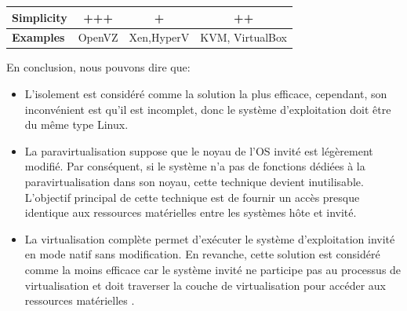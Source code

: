 \begin{table}[H]
\begin{tabular}{|l|c|c|c|}
\textbf{Simplicity}         & +++                                     & +                                                                                                                                                                                                 & ++                                                                                                                                                                                                                    \\ \hline
\textbf{Examples}           & OpenVZ                                  & Xen,HyperV                                                                                                                                                                                        & KVM, VirtualBox                                                                                                                                                                                                       \\ \hline
\end{tabular}
\end{table}

En conclusion, nous pouvons dire que:

\begin{itemize}
    \item 	L'isolement est considéré comme la solution la plus efficace, cependant, son inconvénient est qu'il est incomplet, donc le système d'exploitation doit être du même type Linux.
\item	La paravirtualisation suppose que le noyau de l'OS invité est légèrement modifié. Par conséquent, si le système n'a pas de fonctions dédiées à la paravirtualisation dans son noyau, cette technique devient inutilisable. L'objectif principal de cette technique est de fournir un accès presque identique aux ressources matérielles entre les systèmes hôte et invité.
\item La virtualisation complète  permet d'exécuter le système d'exploitation invité en mode natif sans modification. En revanche, cette solution est considéré comme la moins efficace car le système invité ne participe pas au processus de virtualisation et doit traverser la couche de virtualisation pour accéder aux ressources matérielles \cite{c4}.
\end{itemize}
